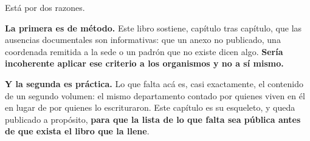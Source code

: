 Está por dos razones.

\textbf{La primera es de método.} Este libro sostiene, capítulo tras capítulo, que las ausencias
documentales son informativas: que un anexo no publicado, una coordenada remitida a la sede o un
padrón que no existe dicen algo. \textbf{Sería incoherente aplicar ese criterio a los
organismos y no a sí mismo.}

\textbf{Y la segunda es práctica.} Lo que falta acá es, casi exactamente, el contenido de un
segundo volumen: el mismo departamento contado por quienes viven en él en lugar de por quienes
lo escrituraron. Este capítulo es su esqueleto, y queda publicado a propósito, \textbf{para que
la lista de lo que falta sea pública antes de que exista el libro que la llene}.

